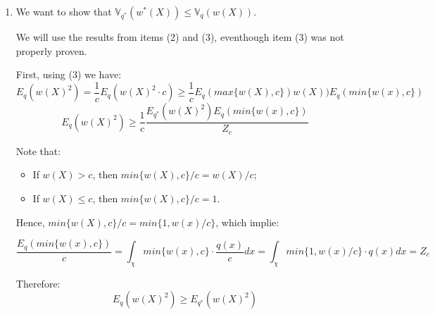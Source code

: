 \documentclass[12pt,letterpaper]{article}
\begin{document}
\begin{enumerate}[leftmargin=!,labelindent=5pt]
	\item 
	We want to show that
	$\mathbb V_{q^*} (w^*(X)) \leq \mathbb V_q(w(X))$.

	We will use the results from items (2) and (3), eventhough
	item (3) was not properly proven.

	First, using (3) we have:
	$$ E_q(w(X)^2) = \frac{1}{c}E_q(w(X)^2\cdot c)
	\geq \frac{1}{c}E_{q}(max\{ w(X), c\})w(X))E_q(min\{w(x),c\})$$
	$$ E_q(w(X)^2) \geq
	\frac{1}{c} \frac{E_{q^*}(w(X)^2)E_q(min\{w(x),c\})}{Z_c}$$

	Note that:
	\begin{itemize}
		\item If $w(X) > c$, then $min\{w(X),c\}/c = w(X)/c$;
		\item If $w(X) \leq c$, then $min\{w(X),c\}/c = 1$.
	\end{itemize}
	Hence, $min\{w(X),c\}/c = min\{1,w(x)/c\}$, which implie:

	$$ \frac{E_q(min\{w(x),c\})}{c} =
	\int_\chi min\{w(x),c\} \cdot \frac{q(x)}{c}dx = 
	\int_\chi min\{1,w(x)/c\} \cdot q(x)dx = Z_c
	$$

	Therefore:
	$$ E_q(w(X)^2) \geq
	E_{q^*}(w(X)^2)$$



\end{enumerate}
\end{document}
